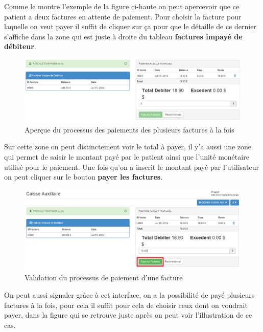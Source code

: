 \documentclass[12pt,a4paper]{report}
\begin{document}
\newpage
Comme le montre l'exemple de la figure ci-haute on peut apercevoir que ce patient a deux factures en attente de paiement. Pour choisir la facture pour laquelle on veut payer il suffit de cliquer sur ça pour que le détaille de ce dernier s'affiche dans la zone qui est juste à droite du tableau \textbf{factures impayé de débiteur}.

\begin{figure}[h]
\begin{center}
\includegraphics[width=14cm]{pic/PaidInvoice.png}
\end{center}
\caption{Aperçue du processus des paiements des plusieurs factures à la fois}
\label{Aperçue du processus des paiements des plusieurs factures à la fois}
\end{figure}

Sur cette zone on peut distinctement voir le total à payer, il y'a aussi une zone qui permet de saisir le montant payé par le patient ainsi que l'unité monétaire utilisé pour  le paiement. Une fois qu'on a inscrit le montant payé par l'utilisateur on peut cliquer sur le bouton \textbf{payer les factures}.

\begin{figure}[h]
\begin{center}
\includegraphics[width=12cm]{pic/PaidInvoiceOK.png}
\end{center}
\caption{Validation du processus de paiement d'une facture}
\label{Validation du processus de paiement d'une facture}
\end{figure}
\newpage
On peut aussi signaler grâce à cet interface, on a la possibilité de payé plusieurs factures à la fois, pour cela il suffit pour cela de choisir ceux dont on voudrait payer, dans la figure qui se retrouve juste après on peut voir l'illustration de ce cas.
\end{document}

